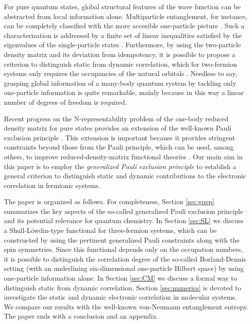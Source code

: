 \documentclass[aps,twocolumn,showpacs,pra,superscriptaddress,floatfix,longbibliography]{revtex4-1}
\newcommand{\7}{\dagger}
\begin{document}
For pure quantum states, global 
structural features of the wave function can be abstracted 
from local information alone. Multiparticle entanglement, for 
instance, can be completely classified with the more accesible 
one-particle picture \cite{Walter1205}. Such a characterization is 
addressed by a finite set of linear inequalities satisfied by 
the eigenvalues of the single-particle states \cite{Sawicki}. 
Furthermore, by using the two-particle density matrix 
and its deviation from idempotency, it is possible to propose a
criterion to distinguish static from dynamic correlation, which for 
two-fermion systems only requires the occupancies of the 
natural orbitals \cite{Matito}. Needless to say, 
grasping global information of a many-body quantum 
system by tackling only one-particle information is quite 
remarkable, mainly because in this way a linear 
number of degrees of freedom is required. 

Recent progress on the N-representability problem  of the 
one-body reduced density matrix for pure states provides
an extension of the well-known Pauli exclusion principle \cite{Kly2}. 
This extension is important because it provides stringent constraints 
beyond those from the Pauli principle, which can be used, 
among others, to improve reduced-density-matrix functional 
theories \cite{RDMFT,recentMazziotti,DePrince}.
Our main aim in this paper is to employ the \textit{generalized Pauli
exclusion principle} to establish a general criterion to distinguish
static and dynamic contributions to the electronic correlation
in fermionic systems. 

The paper is organized as follows. For completeness, 
Section \ref{sec:gpep} summarizes the key aspects of 
the so-called generalized Pauli exclusion principle and 
its potential relevance for quantum chemistry. In Section
 \ref{sec:SL} we discuss a Shull-L\"owdin-type functional 
 for three-fermion systems, which can be constructed by
 using the pertinent generalized Pauli constraints along 
 with the  spin symmetries. Since this functional 
 depends only on the occupation numbers, it is possible to 
 distinguish the correlation degree
 of the so-called Borland-Dennis setting (with an
 underlining six-dimensional one-particle Hilbert space) by 
 using one-particle 
 information alone.  In Section \ref{sec:CM} we discuss 
 a formal way to distinguish static from dynamic correlation.
Section \ref{sec:numerics} is devoted to investigate the 
static and dynamic electronic correlation in molecular 
systems. We compare our results with the well-known 
von-Neumann entanglement entropy. The paper ends 
with a conclusion and an appendix.
\end{document}
